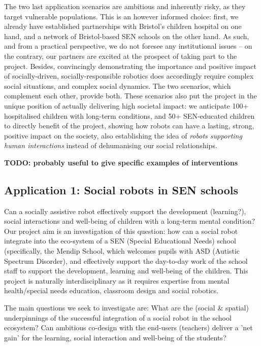 \documentclass[11pt,a4paper]{report}
\newcommand{\TODO}[1]{{\color{red}\textbf{TODO: #1}}}
\begin{document}
The two last application scenarios are ambitious and inherently risky, as they
target vulnerable populations. This is an however informed choice: first, we
already have established partnerships with Bristol's children hospital on one
hand, and a network of Bristol-based SEN schools on the other hand. As such, and
from a practical perspective, we do not foresee any institutional issues -- on
the contrary, our partners are excited at the prospect of taking part to the
project. Besides, convincingly demonstrating the importance and positive impact
of socially-driven, socially-responsible robotics does accordingly require
complex social situations, and complex social dynamics. The two scenarios, which
complement each other, provide both. These scenarios also put the project in the
unique position of actually delivering high societal impact: we anticipate 100+
hospitalised children with long-term conditions, and 50+ SEN-educated children
to directly benefit of the project, showing how robots can have a lasting,
strong, positive impact on the society, also establishing the idea of
\emph{robots supporting human interactions} instead of dehumanising our social
relationships.


\TODO{probably useful to give specific examples of interventions}


\subsection{Application 1: Social robots in SEN schools}

Can a socially assistive robot effectively support the development (learning?),
social interactions and well-being of children with a long-term mental
condition? Our project aim is an investigation of this question: how can a
social robot integrate into the eco-system of a SEN (Special Educational Needs)
school (specifically, the Mendip School, which welcomes pupils with ASD
(Autistic Spectrum Disorder), and effectively support the day-to-day work of the
school staff to support the development, learning and well-being of the
children. This project is naturally interdisciplinary as it requires expertise
from mental health/special needs education, classroom design and social
robotics. 

The main questions we seek to investigate are: What are the (social \& spatial)
underpinnings of the successful integration of a social robot in the school
ecosystem? Can ambitious co-design with the end-users (teachers) deliver a 'net
gain' for the learning, social interaction and well-being of the students? 
\end{document}
